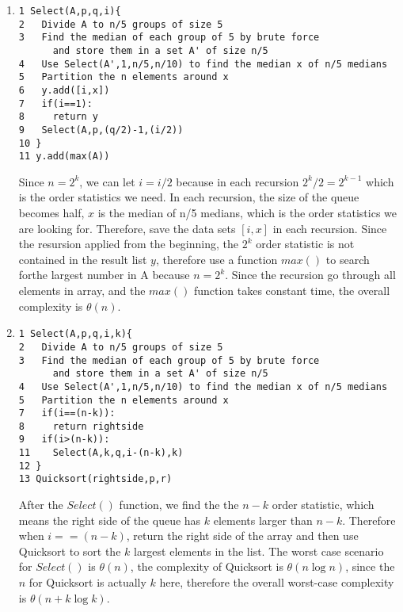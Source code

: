 \documentclass{article}
\begin{document}
\begin{enumerate}
{\bf d)}
\begin{verbatim}
1 Use the algorithm in previous question to merge both heaps
2 For i = 0 to 2n:
3   result.add(Heap-Extrac-Max(A))
4 End
5 Return result
\end{verbatim}
Merge both heaps to one heap in order to use $Heap-Extrac-Max()$ function, record the root each time to generate the sorted 2n keys in a list. The merging process takes $O(\log n)$, the for loop and Heap-Extrac-Max() function takes $O(2n\cdot \log n)$, therefore the overall complexity is $O(\log n + 2n\cdot \log n) = O(n\log n)$

\item
\begin{verbatim}
1 Select(A,p,q,i){
2   Divide A to n/5 groups of size 5
3   Find the median of each group of 5 by brute force
      and store them in a set A' of size n/5
4   Use Select(A',1,n/5,n/10) to find the median x of n/5 medians
5   Partition the n elements around x
6   y.add([i,x])
7   if(i==1):
8     return y
9   Select(A,p,(q/2)-1,(i/2))
10 }
11 y.add(max(A))
\end{verbatim}
Since $n=2^k$, we can let $i=i/2$ because in each recursion $2^k/2=2^{k-1}$ which is the order statistics we need. In each recursion, the size of the queue becomes half, $x$ is the median of n/5 medians, which is the order statistics we are looking for. Therefore, save the data sets $[i,x]$ in each recursion. Since the resursion applied from the beginning, the $2^k$ order statistic is not contained in the result list $y$, therefore use a function $max()$ to search forthe largest number in A because $n=2^k$.
Since the recursion go through all elements in array, and the $max()$ function takes constant time, the overall complexity is $\theta(n)$.

\item
\begin{verbatim}
1 Select(A,p,q,i,k){
2   Divide A to n/5 groups of size 5
3   Find the median of each group of 5 by brute force
      and store them in a set A' of size n/5
4   Use Select(A',1,n/5,n/10) to find the median x of n/5 medians
5   Partition the n elements around x
7   if(i==(n-k)):
8     return rightside
9   if(i>(n-k)):
11    Select(A,k,q,i-(n-k),k)
12 }
13 Quicksort(rightside,p,r)
\end{verbatim}
After the $Select()$ function, we find the the $n-k$ order statistic, which means the right side of the queue has $k$ elements larger than $n-k$. Therefore when $i==(n-k)$, return the right side of the array and then use Quicksort to sort the $k$ largest elements in the list. The worst case scenario for $Select()$ is $\theta (n)$, the complexity of Quicksort is $\theta (n\log n)$, since the $n$ for Quicksort is actually $k$ here, therefore the overall worst-case complexity is $\theta (n+k\log k)$.

\end{enumerate}
\end{document}
